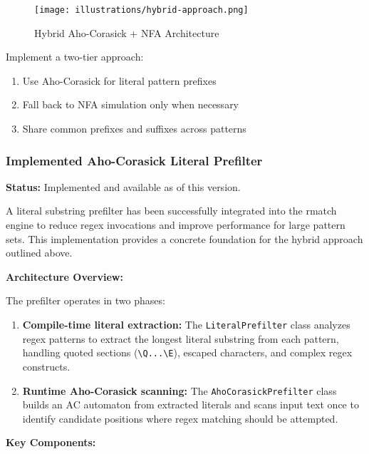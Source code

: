 \documentclass[11pt,a4paper]{article}
\begin{document}
\begin{figure}[htbp]
\centering
\texttt{[image: illustrations/hybrid-approach.png]}
\caption{Hybrid Aho-Corasick + NFA Architecture}
\label{fig:hybrid}
\end{figure}

Implement a two-tier approach:
\begin{enumerate}
\item Use Aho-Corasick for literal pattern prefixes
\item Fall back to NFA simulation only when necessary
\item Share common prefixes and suffixes across patterns
\end{enumerate}

\subsubsection{Implemented Aho-Corasick Literal Prefilter}

\textbf{Status:} Implemented and available as of this version.

A literal substring prefilter has been successfully integrated into the rmatch engine to reduce regex invocations and improve performance for large pattern sets. This implementation provides a concrete foundation for the hybrid approach outlined above.

\textbf{Architecture Overview:}

The prefilter operates in two phases:
\begin{enumerate}
\item \textbf{Compile-time literal extraction:} The \texttt{LiteralPrefilter} class analyzes regex patterns to extract the longest literal substring from each pattern, handling quoted sections (\texttt{\textbackslash Q...\textbackslash E}), escaped characters, and complex regex constructs.
\item \textbf{Runtime Aho-Corasick scanning:} The \texttt{AhoCorasickPrefilter} class builds an AC automaton from extracted literals and scans input text once to identify candidate positions where regex matching should be attempted.
\end{enumerate}

\textbf{Key Components:}
\end{document}
